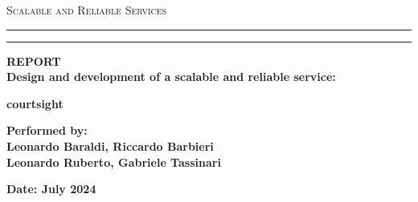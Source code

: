 \documentclass[a4paper]{article}
\numberwithin{equation}{section}
\begin{document}
\begin{titlepage}
\begin{center}
{{\Large{\textsc{Scalable and Reliable Services}}}} \rule[0.1cm]{15.8cm}{0.1mm}
\rule[0.5cm]{15.8cm}{0.6mm}
{\small{\bf REPORT\\
Design and development of a scalable and reliable service:}}
\end{center}
\vspace{15mm}
\begin{center}
{\LARGE{\bf courtsight}}\\
\end{center}
\vspace{40mm}
\par
\noindent
\vspace{20mm}
\begin{center}
    {\large{\bf Performed by:\\
    Leonardo Baraldi, Riccardo Barbieri \\
Leonardo Ruberto, Gabriele Tassinari}}
\end{center}
\vspace{30mm}
\begin{center}
{\large{\bf 
Date: July 2024 }}
\end{center}
\end{titlepage}
\newpage
\newpage
\tableofcontents 
\newpage
    
\newpage







%
\end{document}
